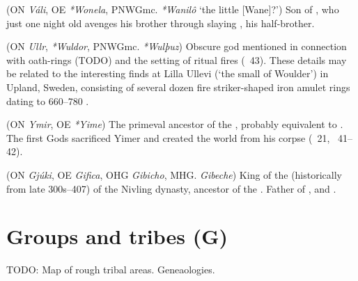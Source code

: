 \begin{itemize}
 (ON \emph{Váli}, OE \emph{*Wonela}, PNWGmc. \emph{*Wanilô} ‘the little [Wane]?’)
  Son of , who just one night old avenges his brother  through slaying , his half-brother.

 (ON \emph{Ullr}, \emph{*Wuldor}, PNWGmc. \emph{*Wulþuz})
  Obscure god mentioned in connection with oath-rings (TODO) and the setting of ritual fires (\Grimnismal\ 43). These details may be related to the interesting finds at Lilla Ullevi (‘the small  of Woulder’) in Upland, Sweden, consisting of several dozen fire striker-shaped iron amulet rings dating to 660–780 \textcite{afEdholm2009}.

 (ON \emph{Ymir}, OE \emph{*Yime})
  The primeval ancestor of the , probably equivalent to .  The first Gods sacrificed Yimer and created the world from his corpse (\Vafthrudnismal\ 21, \Grimnismal\ 41–42).

 (ON \emph{Gjúki}, OE \emph{Gifica}, OHG \emph{Gibicho}, MHG. \emph{Gibeche})
  King of the  (historically from late 300s–407) of the Nivling dynasty, ancestor of the . Father of ,  and .
\end{itemize}

\section{Groups and tribes (G)}
TODO: Map of rough tribal areas. Geneaologies.

